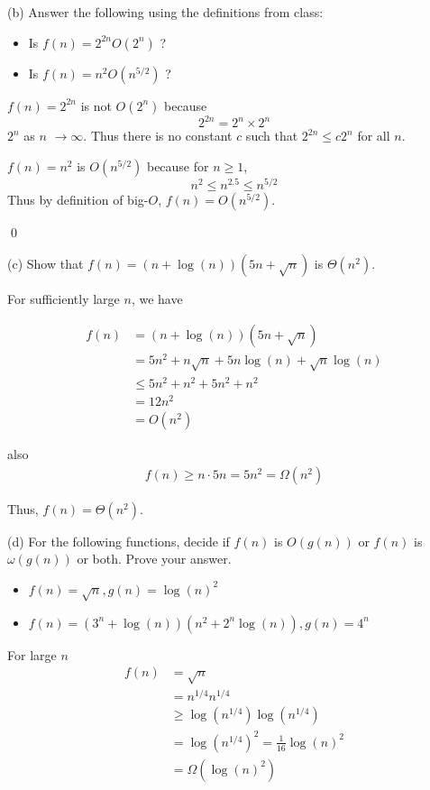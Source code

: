 \documentclass[11pt]{article}
\begin{document}
(b) Answer the following using the definitions from class:
\begin{itemize}
    \item Is $f(n) = 2^{2n} O(2^n)$ ?
    \item Is $f(n) = n^2 O\left(n^{5/2}\right)$ ?
\end{itemize}

\solution

$f(n) = 2^{2n}$ is not $O(2^n)$ because
\[2^{2n} = 2^{n} \times 2^{n}\]
$2^n$ as $n$ $\to \infty$. Thus there is no constant $c$ such that $2^{2n} \le c2^n$ for all $n$.

$f(n) = n^2$ is $O\left(n^{5/2}\right)$ because for $n\ge 1$,
\[n^2 \le n^{2.5} \le n^{5/2}\]
Thus by definition of big-$O$, $f(n) = O\left(n^{5/2}\right)$.

\qed


(c) Show that $f(n) = (n+\log(n))(5n + \sqrt{n})$ is $\Theta(n^2)$.

\solution

For sufficiently large $n$, we have

\begin{align*}
    f(n) &= (n+\log(n))(5n + \sqrt{n})\\
         &= 5n^2 + n\sqrt{n} + 5n\log(n) + \sqrt{n}\log(n)\\
         &\le 5n^2 + n^2 + 5n^2 + n^2\\
         &= 12n^2\\
         &= O(n^2)
\end{align*}

also
\begin{align*}
    f(n) \ge n \cdot 5n = 5n^2 = \Omega(n^2)
\end{align*}

Thus, $f(n) = \Theta(n^2)$.

(d) For the following functions, decide if $f(n)$ is $O(g(n))$ or $f(n)$ is $\omega(g(n))$ or both. Prove your answer.
\begin{itemize}
    \item $f(n) = \sqrt{n}, g(n) = \log(n)^2$
    \item $f(n) = (3^n +\log(n))(n^2 +2^n\log(n)), g(n)=4^n$
\end{itemize}

\solution

For large $n$
\begin{align*}
    f(n) &= \sqrt{n}\\
         &= n^{1/4}n^{1/4}\\
         &\ge \log(n^{1/4})\log(n^{1/4})\\
         &= \log(n^{1/4})^2 = \frac{1}{16} \log(n)^2\\
         &= \Omega(\log(n)^2)
\end{align*}
\end{document}
